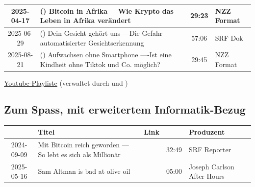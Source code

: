 \begin{table}[H]
\begin{tabular}{c|p{8cm}|c|c|l}
		2025-04-17  & (\ratingcolor{2}) Bitcoin in Afrika ---\newline Wie Krypto das Leben in Afrika verändert & \href{https://www.srf.ch/play/tv/nzz-format/video/bitcoin-in-afrika---wie-krypto-das-leben-in-afrika-veraendert?urn=urn:srf:video:1607aa49-95a8-4f12-9c75-e5aba96a53fe}{\faLink} & 29:23 & NZZ Format         \\\midrule
		2025-06-29  & (\ratingcolor{5}) Dein Gesicht gehört uns ---\newline Die Gefahr automatisierter Gesichtserkennung & \footnotemark & 57:06 & SRF Dok         \\\midrule
		2025-08-21  & (\ratingcolor{5}) Aufwachsen ohne Smartphone ----\newline Ist eine Kindheit ohne Tiktok und Co. möglich? & \href{https://www.srf.ch/play/tv/nzz-format/video/aufwachsen-ohne-smartphone---ist-eine-kindheit-ohne-tiktok-und-co--moeglich?urn=urn:srf:video:0fb13fb2-cc18-448f-9a5f-2ff411c16877}{\faLink}                                               & 29:45           & NZZ Format         \\
	\end{tabular}
\end{table}


\href{https://www.youtube.com/watch?v=lv6op2HHIuM&list=PLUfZiVdJui-7XfvuS5iu8oE2EOGLv8hGk&index=3}{Youtube-Playliste} (verwaltet durch \href{\mainauthormailA}{\mainauthorA} und \href{\mainauthormailB}{\mainauthorB})

\clearpage
\subsection{Zum Spass, mit erweitertem Informatik-Bezug}
\begin{table}[H]
	\small
	\centering
	\begin{tabular}{c|p{6.5cm}|c|c|l}
		\faCalendar & \textbf{Titel}                                 & \textbf{Link}                                               & \faClock          & \textbf{Produzent}                \\\midrule\midrule
		2024-09-09  & Mit Bitcoin reich geworden --- So lebt es sich als Millionär & \href{https://www.srf.ch/play/tv/reporter/video/mit-bitcoin-reich-geworden---so-lebt-es-sich-als-millionaer?urn=urn:srf:video:6bca854e-87a0-4687-8ca0-957c81054625}{\faLink}\href{\downloadLink}{\faDownload} & 32:49 & SRF Reporter \\\midrule
		2025-05-16  & Sam Altman is bad at olive oil                 & \href{https://youtu.be/t_YoPlGZ_ws?t=2705}{\faLink}         & 05:00             & Joseph Carlson After Hours        \\
	\end{tabular}
\end{table}

